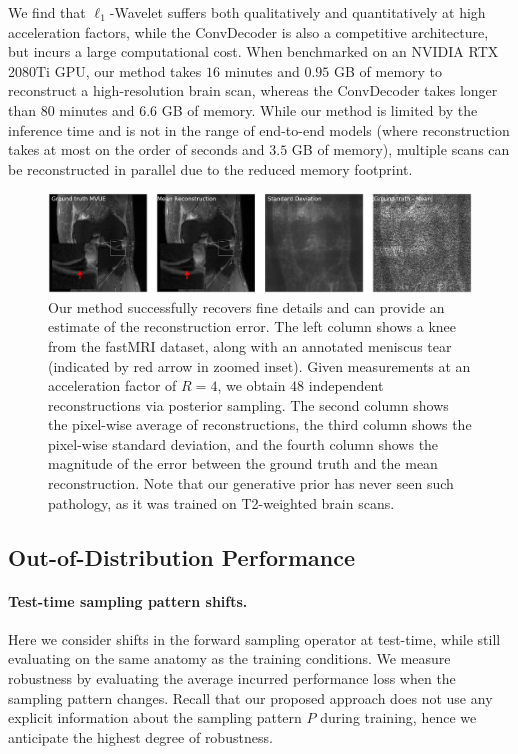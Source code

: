 \documentclass{article}
\begin{document}
We find that $\ell_1$-Wavelet suffers both qualitatively and quantitatively at high acceleration factors, while the ConvDecoder is also a competitive architecture, but incurs a large computational cost. When benchmarked on an NVIDIA RTX 2080Ti GPU, our method takes $16$ minutes and $0.95$ GB of memory to reconstruct a high-resolution brain scan, whereas the ConvDecoder takes longer than $80$ minutes and $6.6$ GB of memory. While our method is limited by the inference time and is not in the range of end-to-end models (where reconstruction takes at most on the order of seconds and $3.5$ GB of memory), multiple scans can be reconstructed in parallel due to the reduced memory footprint.
\begin{figure}[t]
\begin{center}
  \includegraphics[width=\columnwidth]{uncertainty_annotated-comp.pdf}
\end{center}
\caption{\small Our method successfully recovers fine details and can provide an estimate of the reconstruction error. The left column shows a knee from the fastMRI dataset, along with an annotated meniscus tear (indicated by red arrow in zoomed inset). Given measurements at an acceleration factor of $R=4$, we obtain $48$ independent reconstructions via posterior sampling. The second column shows the pixel-wise average of reconstructions, the third column shows the pixel-wise standard deviation, and the fourth column shows the magnitude of the error between the ground truth and the mean reconstruction. Note that our generative prior has never seen such pathology, as it was trained on T2-weighted brain scans.}
\label{fig:tear}
\end{figure}




\subsection{Out-of-Distribution Performance}\label{sec:exp-out}

\paragraph{Test-time sampling pattern shifts.}
Here we consider shifts in the forward sampling operator at test-time, while still evaluating on the same anatomy as the training conditions. We measure robustness by evaluating the average incurred performance loss when the sampling pattern changes. Recall that our proposed approach does not use any explicit information about the sampling pattern $P$ during training, hence we anticipate the highest degree of robustness. 
\end{document}
